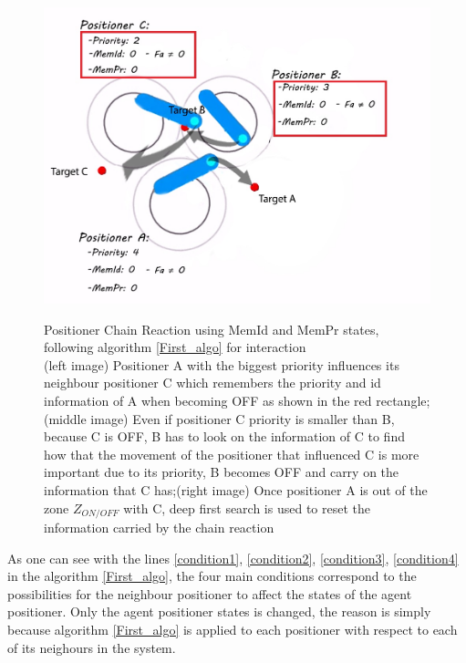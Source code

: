\documentclass[]{spie}  %
\begin{document}
\begin{figure}[H]
\begin{minipage}[t]{5.4cm}
 			\includegraphics[scale=0.3]{images/ID_PR2.jpg}
 			\label{ID_PR2}
 		\end{minipage}
 		\caption{\centering Positioner Chain Reaction using MemId and MemPr states, following algorithm \ref{First_algo} for interaction\\
 			(left image) Positioner A with the biggest priority influences its neighbour positioner C which remembers the priority and id information of A when becoming OFF as shown in the red rectangle; (middle image) Even if positioner C priority is smaller than B, because C is OFF, B has to look on the information of C to find how that the movement of the positioner that influenced C is more important due to its priority, B becomes OFF and carry on the information that C has;(right image) Once positioner A is out of the zone $Z_{ON/OFF}$ with C, deep first search is used to reset the information carried by the chain reaction }
 		\label{ID_PR}
 	\end{figure}
	 As one can see with the lines \ref{condition1}, \ref{condition2}, \ref{condition3}, \ref{condition4} in the algorithm \ref{First_algo}, the four main conditions correspond to the possibilities for the neighbour positioner to affect the states of the agent positioner. Only the agent positioner states is changed, the reason is simply because algorithm \ref{First_algo} is applied to each positioner with respect to each of its neighours in the system.\\
	 
\end{document}
